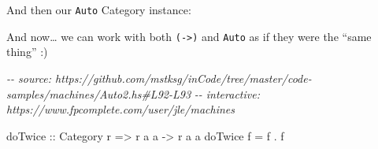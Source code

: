 \documentclass[]{article}
\newenvironment{Shaded}{}{}
\newcommand{\CommentTok}[1]{\textcolor[rgb]{0.38,0.63,0.69}{\textit{#1}}}
\newcommand{\DataTypeTok}[1]{\textcolor[rgb]{0.56,0.13,0.00}{#1}}
\newcommand{\FunctionTok}[1]{\textcolor[rgb]{0.02,0.16,0.49}{#1}}
\newcommand{\KeywordTok}[1]{\textcolor[rgb]{0.00,0.44,0.13}{\textbf{#1}}}
\newcommand{\NormalTok}[1]{#1}
\newcommand{\OperatorTok}[1]{\textcolor[rgb]{0.40,0.40,0.40}{#1}}
\newcommand{\OtherTok}[1]{\textcolor[rgb]{0.00,0.44,0.13}{#1}}
\begin{document}
And then our \texttt{Auto} Category instance:

\begin{Shaded}
\end{Shaded}

And now\ldots{} we can work with both \texttt{(-\textgreater{})} and
\texttt{Auto} as if they were the ``same thing'' :)

\begin{Shaded}
\begin{Highlighting}[]
\CommentTok{{-}{-} source: https://github.com/mstksg/inCode/tree/master/code{-}samples/machines/Auto2.hs\#L92{-}L93}
\CommentTok{{-}{-} interactive: https://www.fpcomplete.com/user/jle/machines}

\OtherTok{doTwice ::} \DataTypeTok{Category}\NormalTok{ r }\OtherTok{=\textgreater{}}\NormalTok{ r a a }\OtherTok{{-}\textgreater{}}\NormalTok{ r a a}
\NormalTok{doTwice f }\OtherTok{=}\NormalTok{ f }\OperatorTok{.}\NormalTok{ f}
\end{Highlighting}
\end{Shaded}
\end{document}
